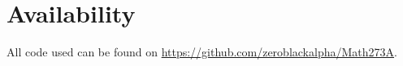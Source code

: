 \documentclass[letterpaper,twocolumn,12pt]{article}
\begin{document}
\section*{Availability}
All code used can be found on \url{https://github.com/zeroblackalpha/Math273A}.




\end{document}
